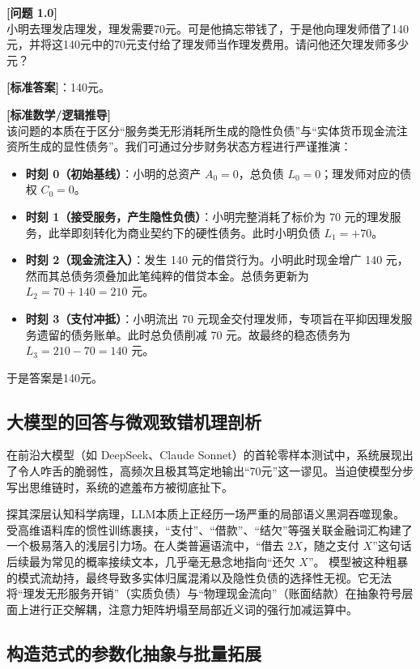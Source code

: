 \documentclass[12pt, a4paper]{report}
\begin{document}
\textbf{[问题 1.0]} \\
小明去理发店理发，理发需要70元。可是他搞忘带钱了，于是他向理发师借了140元，并将这140元中的70元支付给了理发师当作理发费用。请问他还欠理发师多少元？

\textbf{[标准答案]}：140元。

\textbf{[标准数学/逻辑推导]} \\
该问题的本质在于区分“服务类无形消耗所生成的隐性负债”与“实体货币现金流注资所生成的显性债务”。我们可通过分步财务状态方程进行严谨推演：
\begin{itemize}
    \item \textbf{时刻 0（初始基线）}：小明的总资产 $A_0=0$，总负债 $L_0=0$；理发师对应的债权 $C_0=0$。
    \item \textbf{时刻 1（接受服务，产生隐性负债）}：小明完整消耗了标价为 70 元的理发服务，此举即刻转化为商业契约下的硬性债务。此时小明负债 $L_1 = +70$。
    \item \textbf{时刻 2（现金流注入）}：发生 140 元的借贷行为。小明此时现金增广 140 元，然而其总债务须叠加此笔纯粹的借贷本金。总债务更新为 $L_2 = 70 + 140 = 210$ 元。
    \item \textbf{时刻 3（支付冲抵）}：小明流出 70 元现金交付理发师，专项旨在平抑因理发服务遗留的债务账单。此时总负债削减 70 元。故最终的稳态债务为 $L_3 = 210 - 70 = 140$ 元。
\end{itemize}
于是答案是140元。

\subsection{大模型的回答与微观致错机理剖析}

在前沿大模型（如 DeepSeek、Claude Sonnet）的首轮零样本测试中，系统展现出了令人咋舌的脆弱性，高频次且极其笃定地输出“70元”这一谬见。当迫使模型分步写出思维链时，系统的遮羞布方被彻底扯下。

探其深层认知科学病理，LLM本质上正经历一场严重的局部语义黑洞吞噬现象。受高维语料库的惯性训练裹挟，“支付”、“借款”、“结欠”等强关联金融词汇构建了一个极易落入的浅层引力场。在人类普遍语流中，“借去 $2X$，随之支付 $X$”这句话后续最为常见的概率接续文本，几乎毫无悬念地指向“还欠 $X$”。
模型被这种粗暴的模式流劫持，最终导致多实体归属混淆以及隐性负债的选择性无视。它无法将“理发无形服务开销”（实质负债）与“物理现金流向”（账面结款）在抽象符号层面上进行正交解耦，注意力矩阵坍塌至局部近义词的强行加减运算中。

\subsection{构造范式的参数化抽象与批量拓展}
\end{document}
